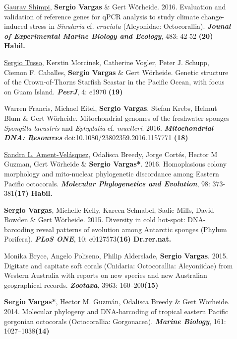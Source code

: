 \documentclass[letter,10pt]{article}
\begin{document}
\begin{description}
\item[]\underline{\underline{Gaurav Shimpi}}, \textbf{Sergio Vargas} \& Gert W\"orheide. 2016. Evaluation and validation of reference genes for qPCR analysis to study climate change-induced stress in \emph{Sinularia} cf. \emph{cruciata} (Alcyonidae: Octocorallia). \textbf{\emph{Jounal of Experimental Marine Biology and Ecology}}, 483: 42-52 \hfill\textbf{{\scriptsize (20) Habil.}}

\item[]\underline{Sergio Tusso}, Kerstin Morcinek, Catherine Vogler, Peter J. Schupp,  Ciemon F. Caballes, \textbf{Sergio Vargas} \& Gert W\"orheide. Genetic structure of the Crown-of-Thorns Starfish Seastar in the Pacific Ocean, with focus on Guam Island. \textbf{\emph{PeerJ}}, 4: e1970 \hfill\textbf{{\scriptsize (19)}}

\item[]Warren Francis, Michael Eitel, \textbf{Sergio Vargas}, Stefan Krebs, Helmut Blum \& Gert W\"orheide. Mitochondrial genomes of the freshwater sponges \emph{Spongilla lacustris} and \emph{Ephydatia} cf. \emph{muelleri}. 2016. \textbf{\emph{Mitochondrial DNA: Resources}} doi:10.1080/23802359.2016.1157771 \hfill\textbf{{\scriptsize (18)}}

\item[]\underline{Sandra L. Ament-Vel\'asquez}, Odalisca Breedy, Jorge Cort\'es, Hector M Guzman, Gert W\"orheide \& \textbf{Sergio Vargas*}. 2016. Homoplasious colony morphology and mito-nuclear phylogenetic discordance among Eastern Pacific octocorals. \textbf{\emph{Molecular Phylogenetics and Evolution}}, 98: 373-381\hfill\textbf{{\scriptsize (17) Habil.}}

\item[]\textbf{Sergio Vargas}, Michelle Kelly, Kareen Schnabel, Sadie Mills, David Bowden \& Gert W\"orheide. 2015. Diversity in cold hot-spot: DNA-barcoding reveal patterns of evolution among Antarctic sponges (Phylum Porifera). \textbf{\emph{PLoS ONE}}, 10: e0127573\hfill\textbf{{\scriptsize (16) Dr.rer.nat.}}

\item[]Monika Bryce, Angelo Poliseno, Philip Alderslade, \textbf{Sergio Vargas}. 2015. Digitate and capitate soft corals (Cnidaria: Octocorallia: Alcyoniidae) from Western Australia with reports on new species and new Australian geographical records. \textbf{\emph{Zootaxa}}, 3963: 160--200\hfill\textbf{{\scriptsize (15)}}

\item[]\textbf{Sergio Vargas*}, Hector M. Guzm\'an, Odalisca Breedy \& Gert W\"orheide. 2014. Molecular phylogeny and DNA-barcoding of tropical eastern Pacific gorgonian octocorals (Octocorallia: Gorgonacea). \textbf{\emph{Marine Biology}}, 161: 1027--1038\hfill\textbf{{\scriptsize (14)}}


\end{description}
\end{document}
